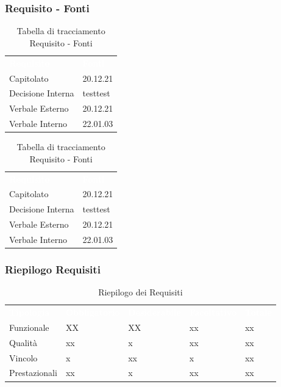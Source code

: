 \subsubsection{Requisito - Fonti}

\begin{table}[!htbp]
\renewcommand{\arraystretch}{1.5}
\begin{tabular}{ m{}<{\centering}  m{}<{\centering} }
	\rowcolor{darkblue}
	\textcolor{white}{\textbf{Requisito}} &\textcolor{white}{\textbf{Fonti}}\\ 

	Capitolato & 20.12.21\\	

	Decisione Interna & testtest \\
	
	Verbale Esterno & 20.12.21\\
	
	Verbale Interno & 22.01.03 \\

\end{tabular}
\begin{tabular}{ m{}<{\centering}  m{}<{\centering} }
	\rowcolor{darkblue}
	\textcolor{white}{\textbf{Requisito}} &\textcolor{white}{\textbf{Fonti}}\\ 

	Capitolato & 20.12.21\\	

	Decisione Interna & testtest \\
	
	Verbale Esterno & 20.12.21\\
	
	Verbale Interno & 22.01.03 \\

\end{tabular}
\caption{Tabella di tracciamento Requisito - Fonti}
\end{table}

\subsubsection{Riepilogo Requisiti}

\begin{table}[!htbp]
\renewcommand{\arraystretch}{1.5}
\begin{tabular}{ m{}<{\centering}  m{}<{\centering}  m{}<{\centering}  m{}<{\centering}  m{}<{\centering} }
	\rowcolor{darkblue}
	\textcolor{white}{\textbf{Tipologia}} &\textcolor{white}{\textbf{Obbligatorio}}& \textcolor{white}{\textbf{Desiderabile}} & \textcolor{white}{\textbf{Facoltativo}}&\textcolor{white}{\textbf{Totale}}\\ 
	Funzionale & XX & XX & xx & xx\\	
	Qualità & xx & x & xx & xx\\	
	Vincolo & x & xx & x & xx\\	
	Prestazionali & xx & x & xx & xx\\	
\end{tabular}
\caption{Riepilogo dei Requisiti}
\end{table}
